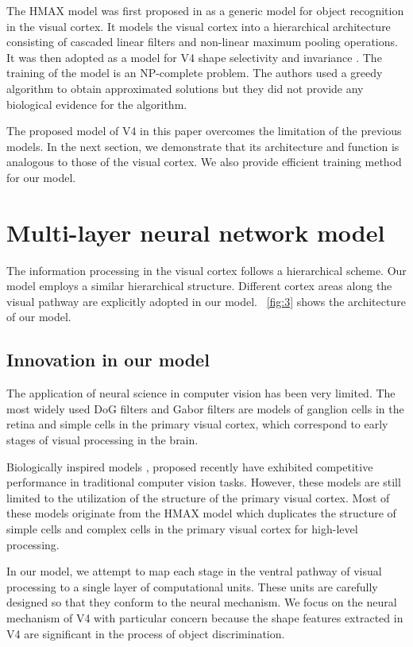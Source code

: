 \documentclass[5p]{elsarticle}
\begin{document}
The HMAX model was first proposed in \cite{riesenhuber1999}
as a generic model for object recognition in the visual cortex.
It models the visual cortex into a hierarchical architecture 
consisting of cascaded linear filters and non-linear maximum pooling operations.
It was then adopted as a model for V4 shape selectivity and invariance \cite{cadieu2007}.
The training of the model is an NP-complete problem. 
The authors used a greedy algorithm to obtain approximated solutions
but they did not provide any biological evidence for the algorithm. 

The proposed model of V4 in this paper overcomes the limitation of the previous models.
In the next section, we demonstrate that its architecture and function is analogous 
to those of the visual cortex.
We also provide efficient training method for our model.

\section{Multi-layer neural network model}\label{sec:3}

The information processing in the visual cortex follows a hierarchical scheme.
Our model employs a similar hierarchical structure.
Different cortex areas along the visual pathway are explicitly adopted in our model. 
\figurename~\ref{fig:3} shows the architecture of our model.

\subsection{Innovation in our model}

The application of neural science in computer vision has been very limited.
The most widely used DoG filters and Gabor filters 
are models of ganglion cells in the retina and simple cells in the primary visual cortex, 
which correspond to early stages of visual processing in the brain.

Biologically inspired models \cite{serre2007, hong2011},
proposed recently have exhibited competitive performance in traditional computer vision tasks.
However, these models are still limited to the utilization 
of the structure of the primary visual cortex. 
Most of these models originate from the HMAX \cite{riesenhuber1999} model 
which duplicates the structure of simple cells and complex cells
in the primary visual cortex for high-level processing.

In our model, we attempt to map each stage in the ventral pathway of visual processing
to a single layer of computational units.
These units are carefully designed so that they conform to the neural mechanism.
We focus on the neural mechanism of V4 with particular concern
because the shape features extracted in V4 are significant in the process of object discrimination.
\end{document}
